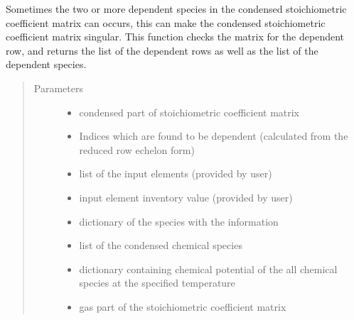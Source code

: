 \documentclass[letterpaper,10pt,english]{sphinxmanual}
\begin{document}
\begin{fulllineitems}
Sometimes the two or more dependent species in the condensed stoichiometric coefficient matrix can occurs, this can make the condensed stoichiometric coefficient matrix singular. This function checks the  matrix for the dependent row, and returns the list of the
dependent rows as well as the list of the dependent species.
\begin{quote}\begin{description}
\item[{Parameters}] \leavevmode\begin{itemize}
\item {} 
 \textendash{} condensed part of stoichiometric coefficient matrix

\item {} 
 \textendash{} Indices which are found to be dependent (calculated from the reduced row echelon form)

\item {} 
 \textendash{} list of the input elements (provided by user)

\item {} 
 \textendash{} input element inventory value (provided by user)

\item {} 
 \textendash{} dictionary of the species with the information

\item {} 
 \textendash{} list of the condensed chemical species

\item {} 
 \textendash{} dictionary containing chemical potential of the all chemical species at the specified temperature

\item {} 
 \textendash{} gas part of the stoichiometric coefficient matrix


\end{itemize}
\end{description}
\end{quote}
\end{fulllineitems}
\end{document}
